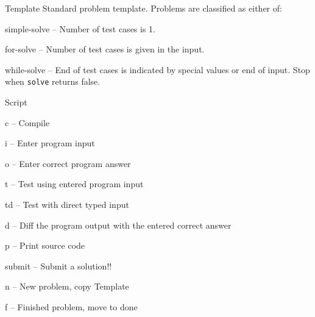 \categorycontents{}


\begin{algorithm}{Template}
\desc
Standard problem template. Problems are classified as either of:
  \begin{description}
  \item{simple-solve} -- Number of test cases is 1.
  \item{for-solve} -- Number of test cases is given in the input.
  \item{while-solve} -- End of test cases is indicated by special values
    or end of input. Stop when {\tt solve} returns false.
  \end{description}
\end{algorithm}

\begin{algorithm}{Script}
  \begin{description}
  \item{c} -- Compile
  \item{i} -- Enter program input
  \item{o} -- Enter correct program answer
  \item{t} -- Test using entered program input
  \item{td} -- Test with direct typed input
  \item{d} -- Diff the program output with the entered correct answer
  \item{p} -- Print source code
  \item{submit} -- Submit a solution!!
  \item{n} -- New problem, copy Template
  \item{f} -- Finished problem, move to done
  \end{description}
\end{algorithm}

